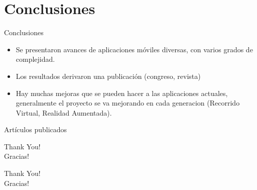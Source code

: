 \documentclass[aspectratio=169,compress]{beamer}
\begin{document}
\section{Conclusiones}
\begin{frame}{Conclusiones}
\begin{itemize}
\item Se presentaron avances de aplicaciones móviles diversas, con varios grados de complejidad.
\item Los resultados derivaron una publicación (congreso, revista)
\item Hay muchas mejoras que se pueden hacer a las aplicaciones actuales, generalmente el proyecto se va mejorando en cada generacion (Recorrido Virtual, Realidad Aumentada).
\end{itemize}
\end{frame}

\renewcommand*{\bibfont}{\tiny}
\begin{frame}[allowframebreaks]{Artículos publicados}
    \printbibliography[title=Artículos publicados,keyword=primary]
\end{frame}

\begin{frame}%
\begin{center}
\Huge Thank You! \\
\Huge Gracias! \\
\end{center}
\end{frame}

\begin{frame}%
\begin{center}
{\fontsize{40}{50}\selectfont Thank You!}\\
{\fontsize{40}{50}\selectfont Gracias!}
\end{center}
\end{frame}

  
\end{document}
